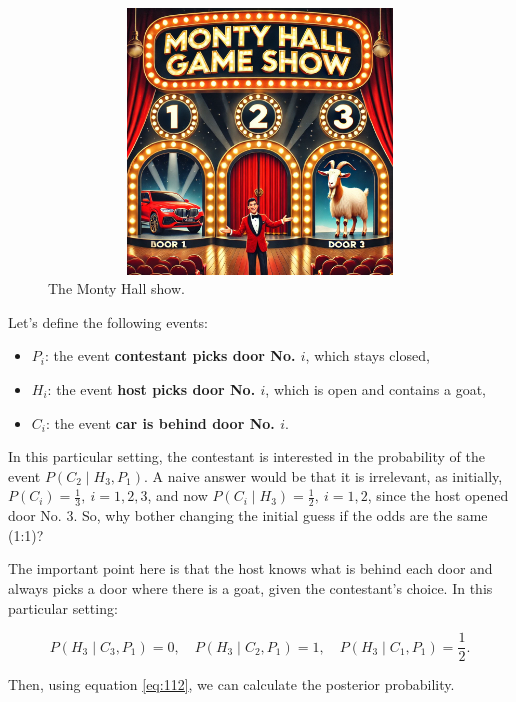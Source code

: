 \begin{figure}
	\includegraphics[width=340pt, height=200pt]{Chapters/chapter1/figures/MHproblemNew.png}
	\caption[List of figure caption goes here]{The Monty Hall show.}\label{fig11}
\end{figure}

Let's define the following events: 

\begin{itemize}
	\item \( P_i \): the event \textbf{contestant picks door No. \( i \)}, which stays closed, 
	\item \( H_i \): the event \textbf{host picks door No. \( i \)}, which is open and contains a goat, 
	\item \( C_i \): the event \textbf{car is behind door No. \( i \)}.
\end{itemize}

In this particular setting, the contestant is interested in the probability of the event \( P(C_2 \mid H_3, P_1) \). A naive answer would be that it is irrelevant, as initially, \( P(C_i) = \frac{1}{3}, \ i = 1, 2, 3 \), and now \( P(C_i \mid H_3) = \frac{1}{2}, \ i = 1, 2 \), since the host opened door No. 3. So, why bother changing the initial guess if the odds are the same (1:1)?

The important point here is that the host knows what is behind each door and always picks a door where there is a goat, given the contestant's choice. In this particular setting:

\[
P(H_3 \mid C_3, P_1) = 0, \quad P(H_3 \mid C_2, P_1) = 1, \quad P(H_3 \mid C_1, P_1) = \frac{1}{2}.
\]

Then, using equation \ref{eq:112}, we can calculate the posterior probability.

